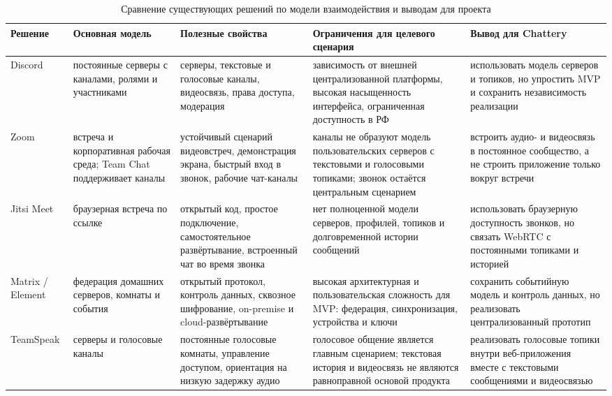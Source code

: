 \documentclass[a4paper,12pt]{extarticle}
\begin{document}
\begin{table}[htbp]
\centering
\small
\renewcommand{\arraystretch}{1.2}
\footnotesize
\begin{tabular}{|p{1.9cm}|p{3.2cm}|p{3.4cm}|p{3.3cm}|p{3.3cm}|}
\hline
\textbf{Решение} & \textbf{Основная модель} & \textbf{Полезные свойства} & \textbf{Ограничения для целевого сценария} & \textbf{Вывод для Chattery} \\
\hline
Discord & постоянные серверы с каналами, ролями и участниками & серверы, текстовые и голосовые каналы, видеосвязь, права доступа, модерация & зависимость от внешней централизованной платформы, высокая насыщенность интерфейса, ограниченная доступность в РФ & использовать модель серверов и топиков, но упростить MVP и сохранить независимость реализации \\
\hline
Zoom & встреча и корпоративная рабочая среда; Team Chat поддерживает каналы & устойчивый сценарий видеовстреч, демонстрация экрана, быстрый вход в звонок, рабочие чат-каналы & каналы не образуют модель пользовательских серверов с текстовыми и голосовыми топиками; звонок остаётся центральным сценарием & встроить аудио- и видеосвязь в постоянное сообщество, а не строить приложение только вокруг встречи \\
\hline
Jitsi Meet & браузерная встреча по ссылке & открытый код, простое подключение, самостоятельное развёртывание, встроенный чат во время звонка & нет полноценной модели серверов, профилей, топиков и долговременной истории сообщений & использовать браузерную доступность звонков, но связать WebRTC с постоянными топиками и историей \\
\hline
Matrix / Element & федерация домашних серверов, комнаты и события & открытый протокол, контроль данных, сквозное шифрование, on-premise и cloud-развёртывание & высокая архитектурная и пользовательская сложность для MVP: федерация, синхронизация, устройства и ключи & сохранить событийную модель и контроль данных, но реализовать централизованный прототип \\
\hline
TeamSpeak & серверы и голосовые каналы & постоянные голосовые комнаты, управление доступом, ориентация на низкую задержку аудио & голосовое общение является главным сценарием; текстовая история и видеосвязь не являются равноправной основой продукта & реализовать голосовые топики внутри веб-приложения вместе с текстовыми сообщениями и видеосвязью \\
\hline
\end{tabular}
\caption{Сравнение существующих решений по модели взаимодействия и выводам для проекта}
\label{tab:analysis}
\end{table}
\end{document}
